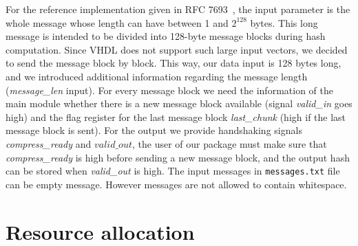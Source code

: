 \documentclass[%
	a4paper,
]
{article}
\newcommand{\todo}[1]{\textcolor{red}{#1}}
\newcommand{\done}[1]{}
\begin{document}
For the reference implementation given in RFC 7693~\autocite{rfc7693},
the input parameter is the whole message whose length can have between 1
and $2^{128}$ bytes.
%
This long message is intended to be divided into 128-byte message blocks
during hash computation. Since VHDL does not support such large input
vectors, we decided to send the message block by block.
%
This way, our data input is 128 bytes long, and we introduced additional
information regarding the message length (\emph{message_len} input).
%
%
For every message block we need the information of the main module whether there
is a new message block available (signal \emph{valid_in} goes high) and the flag
register for the last message block \emph{last_chunk} (high if the last message
block is sent).
%
For the output we provide handshaking signals \emph{compress_ready}
and $valid\_out$, the user of our package must make sure that
\emph{compress_ready} is high before sending a new message block, and the
output hash can be stored when \emph{valid_out} is high.
%
The input messages in \texttt{messages.txt} file can be empty message. However
messages are not allowed to contain whitespace. \done{Why not? This is a very
strong constraint! We should definitely allow whitespace.}
%
%
\pagebreak
\section{Resource allocation}
\label{sec:resource-allocation}

\end{document}
